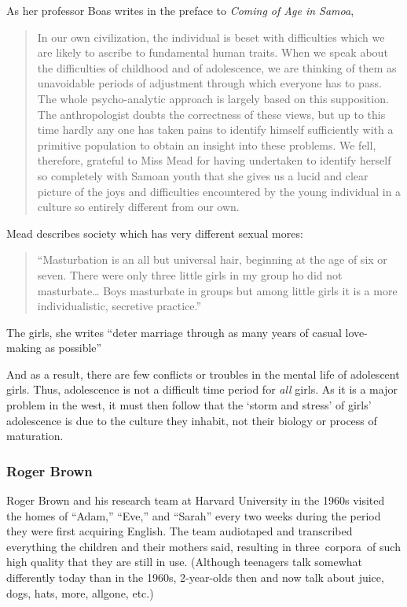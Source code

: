 \begin{refsection}
As her professor Boas writes in the preface to \emph{Coming of Age in Samoa}, 

\begin{quote}

In our own civilization, the individual is beset with difficulties which we are likely to ascribe to fundamental human traits. When we speak about the difficulties of childhood and of adolescence, we are thinking of them as unavoidable periods of adjustment through which everyone has to pass. The whole psycho-analytic approach is largely based on this supposition.
The anthropologist doubts the correctness of these views, but up to this time hardly any one has taken pains to identify himself sufficiently with a primitive population to obtain an insight into these problems. We fell, therefore, grateful to Miss Mead for having undertaken to identify herself so completely with Samoan youth that she gives us a lucid and clear picture of the joys and difficulties encountered by the young individual in a culture so entirely different from our own. ~\citep{Mead:1928uk}
\end{quote}

Mead describes society which has very different sexual mores: 

\begin{quote}

``Masturbation is an all but universal hair, beginning at the age of six or seven. There were only three little girls in my group ho did not masturbate{\ldots} Boys masturbate in groups but among little girls it is a more individualistic, secretive practice.'' ~\citep[p. 136]{Mead:1928uk} 
\end{quote}

The girls, she writes ``deter marriage through as many years of casual love-making as possible'' ~\citep[p. 195]{Mead:1928uk}

And as a result, there are few conflicts or troubles in the mental life of adolescent girls. Thus, adolescence is not a difficult time period for \emph{all} girls. As it is a major problem in the west, it must then follow that the `storm and stress' of girls' adolescence is due to the culture they inhabit, not their biology or process of maturation.

\subsubsection{Roger Brown}
\label{rogerbrown}

Roger Brown and his research team at Harvard University in the 1960s visited the homes of ``Adam,'' ``Eve,'' and ``Sarah'' every two weeks during the period they were first acquiring English. The team audiotaped and transcribed everything the children and their mothers said, resulting in three corpora of such high quality that they are still in use. (Although teenagers talk somewhat differently today than in the 1960s, 2-year-olds then and now talk about juice, dogs, hats, more, allgone, etc.) 


\end{refsection}
